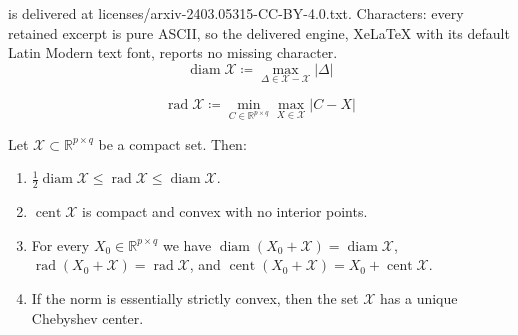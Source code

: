 \documentclass[10pt,a4paper]{amsart}
\DeclareMathOperator{\cent}{cent}
\DeclareMathOperator{\diam}{diam}
\DeclareMathOperator{\rad}{rad}
\newcommand{\norm}[1]{\left|#1\right|}
\begin{document}
is delivered at licenses/arxiv-2403.05315-CC-BY-4.0.txt. Characters: every retained excerpt is pure ASCII, so the delivered engine, XeLaTeX with its default Latin Modern text font, reports no missing character.
\begin{equation}
\label{eq:diam}
\diam \mathcal{X}\coloneqq \max_{\Delta\in\mathcal{X}-\mathcal{X}} \norm{\Delta} 
\end{equation} 

\begin{equation}
\label{eq:cheb}
\rad \mathcal{X}\coloneqq \min_{C\in\mathbb{R}^{p\times q}} \max_{X\in\mathcal{X}} \norm{C-X}
\end{equation}

\begin{proposition}
\label{prop:chebuniq}
Let $\mathcal{X}\subset\mathbb{R}^{p\times q}$ be a compact set. Then:
\begin{enumerate}[label=\normalfont{(\alph*)},ref=\ref{prop:chebuniq}(\alph*)]
    \item\label{prop:chebuniq-a} $\tfrac{1}{2}\diam\mathcal{X}\leq\rad\mathcal{X}\leq\diam\mathcal{X}$.
    \item\label{prop:chebuniq-b} $\cent \mathcal{X}$ is compact and convex with no interior points.
    \item\label{prop:chebuniq-bc} For every $X_0\in\mathbb{R}^{p\times q}$ we have  $\diam(X_0+\mathcal{X})=\diam\mathcal{X}$, $\rad(X_0+\mathcal{X})=\rad\mathcal{X}$, and $\cent(X_0+\mathcal{X})=X_0+\cent\mathcal{X}$.
    \item\label{prop:chebuniq-c} If the norm is essentially strictly convex, then the set $\mathcal{X}$ has a unique Chebyshev center.
\end{enumerate}
\end{proposition}
\end{document}
